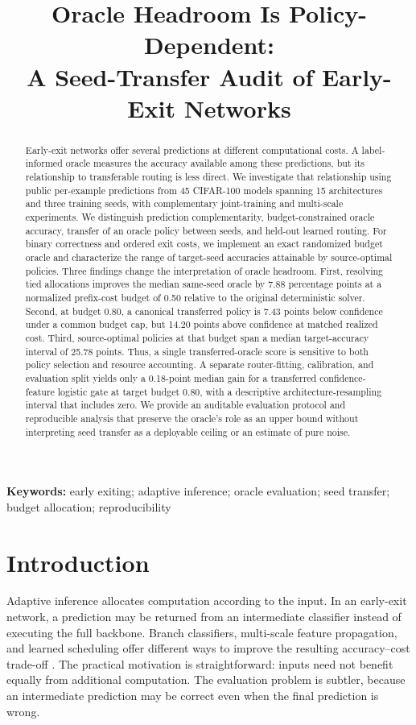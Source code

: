 \documentclass[11pt,a4paper]{article}
\title{\textbf{Oracle Headroom Is Policy-Dependent:}\\A Seed-Transfer Audit of Early-Exit Networks}
\author{}
\date{}
\begin{document}
\maketitle
\begin{abstract}
Early-exit networks offer several predictions at different computational costs. A label-informed oracle measures the accuracy available among these predictions, but its relationship to transferable routing is less direct. We investigate that relationship using public per-example predictions from 45 CIFAR-100 models spanning 15 architectures and three training seeds, with complementary joint-training and multi-scale experiments. We distinguish prediction complementarity, budget-constrained oracle accuracy, transfer of an oracle policy between seeds, and held-out learned routing. For binary correctness and ordered exit costs, we implement an exact randomized budget oracle and characterize the range of target-seed accuracies attainable by source-optimal policies. Three findings change the interpretation of oracle headroom. First, resolving tied allocations improves the median same-seed oracle by 7.88 percentage points at a normalized prefix-cost budget of 0.50 relative to the original deterministic solver. Second, at budget 0.80, a canonical transferred policy is 7.43 points below confidence under a common budget cap, but 14.20 points above confidence at matched realized cost. Third, source-optimal policies at that budget span a median target-accuracy interval of 25.78 points. Thus, a single transferred-oracle score is sensitive to both policy selection and resource accounting. A separate router-fitting, calibration, and evaluation split yields only a 0.18-point median gain for a transferred confidence-feature logistic gate at target budget 0.80, with a descriptive architecture-resampling interval that includes zero. We provide an auditable evaluation protocol and reproducible analysis that preserve the oracle's role as an upper bound without interpreting seed transfer as a deployable ceiling or an estimate of pure noise.
\end{abstract}
\noindent\textbf{Keywords:} early exiting; adaptive inference; oracle evaluation; seed transfer; budget allocation; reproducibility

\section{Introduction}
Adaptive inference allocates computation according to the input. In an early-exit network, a prediction may be returned from an intermediate classifier instead of executing the full backbone. Branch classifiers, multi-scale feature propagation, and learned scheduling offer different ways to improve the resulting accuracy--cost trade-off \citep{branchynet,msdnet,eenet}. The practical motivation is straightforward: inputs need not benefit equally from additional computation. The evaluation problem is subtler, because an intermediate prediction may be correct even when the final prediction is wrong.
\end{document}
